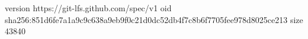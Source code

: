 version https://git-lfs.github.com/spec/v1
oid sha256:851d6fe7a1a9c9c638a9eb9f0c21d0dc52db4f7c8b6f7705fee978d8025ce213
size 43840
